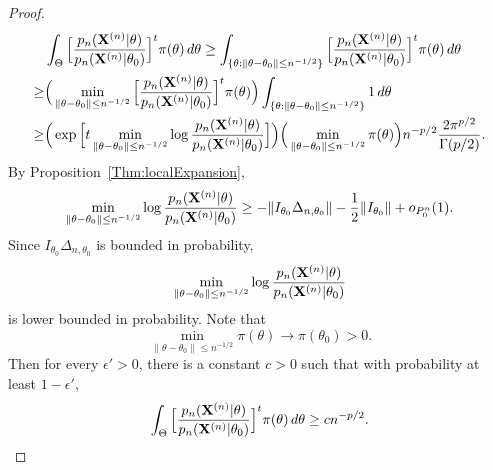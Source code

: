 \documentclass[3p]{elsarticle}
\theoremstyle{plain}
\theoremstyle{definition}
\theoremstyle{remark}
\begin{document}
\begin{proof}
$$\begin{aligned}
        & \int_{\Theta}\Big[\frac{p_n(\mathbf{X}^{(n)}|\theta)}{p_n(\mathbf{X}^{(n)}|\theta_0)}\Big]^{t} \pi(\theta)\, d\theta
        \geq
        \int_{\{\theta:\|\theta-\theta_0\|\leq n^{-1/2}\}}\Big[\frac{p_n(\mathbf{X}^{(n)}|\theta)}{p_n(\mathbf{X}^{(n)}|\theta_0)}\Big]^{t} \pi(\theta)\, d\theta
        \\
        \geq &
        \Big(
        \min_{\|\theta-\theta_0\|\leq n^{-1/2}} 
\Big[\frac{p_n(\mathbf{X}^{(n)}|\theta)}{p_n(\mathbf{X}^{(n)}|\theta_0)}\Big]^{t} \pi(\theta)
        \Big)
        \int_{\{\theta:\|\theta-\theta_0\|\leq n^{-1/2}\}}1\, d\theta\\
        \geq&
        \Big(
        \exp
\Big[
        t\min_{\|\theta-\theta_0\|\leq n^{-1/2}} 
        \log\frac{p_n(\mathbf{X}^{(n)}|\theta)}{p_n(\mathbf{X}^{(n)}|\theta_0)}
        \Big]
        \Big)
        \Big(\min_{\|\theta-\theta_0\|\leq n^{-1/2}} 
        \pi(\theta)
        \Big)
        n^{-p/2}\frac{2\pi^{p/2}}{\Gamma(p/2)}.
    \end{aligned}
    $$
    By Proposition~\ref{Thm:localExpansion},
    $$
   \begin{aligned} 
        \min_{\|\theta-\theta_0\|\leq n^{-1/2}} 
        \log\frac{p_n(\mathbf{X}^{(n)}|\theta)}{p_n(\mathbf{X}^{(n)}|\theta_0)}
        \geq
        -\|I_{\theta_0}\Delta_{n,\theta_0}\|-\frac{1}{2}\|I_{\theta_0}\|+
        o_{P^n_0}(1).
   \end{aligned}
    $$
    Since 
    $I_{\theta_0}\Delta_{n,\theta_0}$
    is bounded in probability, 
    $$\min_{\|\theta-\theta_0\|\leq n^{-1/2}} 
        \log\frac{p_n(\mathbf{X}^{(n)}|\theta)}{p_n(\mathbf{X}^{(n)}|\theta_0)}
    $$ is lower bounded in probability.
    Note that 
    $$\min_{\|\theta-\theta_0\|\leq n^{-1/2}} \pi(\theta)\to \pi(\theta_0)>0.$$
    Then for every $\epsilon'>0$, there is a constant $c>0$ such that with probability at least $1-\epsilon'$,
    $$
         \int_{\Theta}\Big[\frac{p_n(\mathbf{X}^{(n)}|\theta)}{p_n(\mathbf{X}^{(n)}|\theta_0)}\Big]^{t} \pi(\theta)\, d\theta\geq c n^{-p/2}.
    $$







\end{proof}
\end{document}

